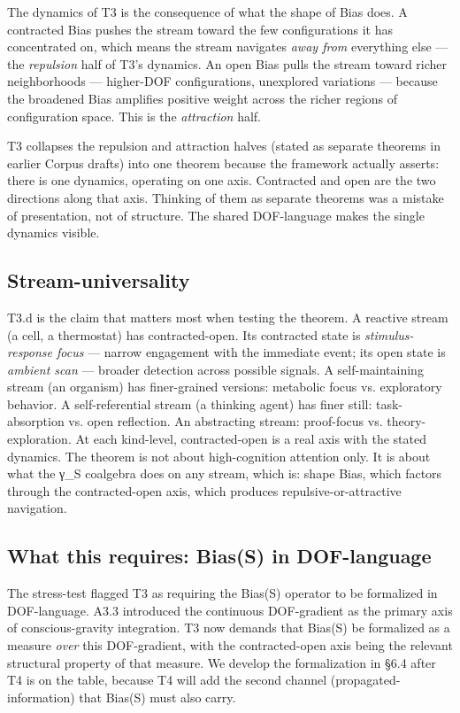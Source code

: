 \documentclass[11pt, openany]{book}
\begin{document}
The dynamics of T3 is the consequence of what the shape of Bias does. A contracted Bias pushes the stream toward the few configurations it has concentrated on, which means the stream navigates \textit{away from} everything else --- the \textit{repulsion} half of T3's dynamics. An open Bias pulls the stream toward richer neighborhoods --- higher-DOF configurations, unexplored variations --- because the broadened Bias amplifies positive weight across the richer regions of configuration space. This is the \textit{attraction} half.

T3 collapses the repulsion and attraction halves (stated as separate theorems in earlier Corpus drafts) into one theorem because the framework actually asserts: there is one dynamics, operating on one axis. Contracted and open are the two directions along that axis. Thinking of them as separate theorems was a mistake of presentation, not of structure. The shared DOF-language makes the single dynamics visible.

\subsection{Stream-universality}

T3.d is the claim that matters most when testing the theorem. A reactive stream (a cell, a thermostat) has contracted-open. Its contracted state is \textit{stimulus-response focus} --- narrow engagement with the immediate event; its open state is \textit{ambient scan} --- broader detection across possible signals. A self-maintaining stream (an organism) has finer-grained versions: metabolic focus vs. exploratory behavior. A self-referential stream (a thinking agent) has finer still: task-absorption vs. open reflection. An abstracting stream: proof-focus vs. theory-exploration. At each kind-level, contracted-open is a real axis with the stated dynamics. The theorem is not about high-cognition attention only. It is about what the γ\_\allowbreak{}S coalgebra does on any stream, which is: shape Bias, which factors through the contracted-open axis, which produces repulsive-or-attractive navigation.

\subsection{What this requires: Bias(S) in DOF-language}

The stress-test flagged T3 as requiring the Bias(S) operator to be formalized in DOF-language. A3.3 introduced the continuous DOF-gradient as the primary axis of conscious-gravity integration. T3 now demands that Bias(S) be formalized as a measure \textit{over} this DOF-gradient, with the contracted-open axis being the relevant structural property of that measure. We develop the formalization in §6.4 after T4 is on the table, because T4 will add the second channel (propagated-information) that Bias(S) must also carry.
\end{document}

